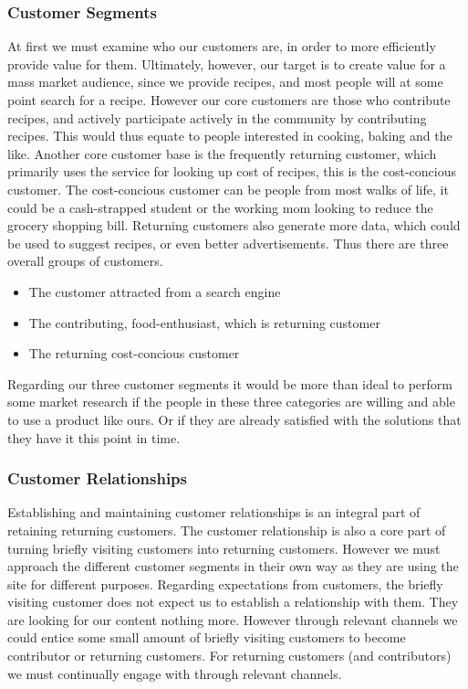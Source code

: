 \documentclass{article}
\begin{document}
\subsubsection{Customer Segments}
At first we must examine who our customers are, in order to more efficiently provide value
for them. Ultimately, however, our target is to create value for a mass market audience,
since we provide recipes, and most people will at some point search for a recipe.  However
our core customers are those who contribute recipes, and actively participate actively in the
community by contributing recipes. This would thus equate to people interested in cooking,
baking and the like.  Another core customer base is the frequently returning customer,
which primarily uses the service for looking up cost of recipes, this is the cost-concious
customer. The cost-concious customer can be people from most walks of life, it could be a
cash-strapped student or the working mom looking to reduce the grocery shopping bill.
Returning customers also generate more data, which could be used to suggest recipes, or
even better advertisements. Thus there are three overall groups of customers.

\begin{itemize}
  \item The customer attracted from a search engine
  \item The contributing, food-enthusiast, which is returning customer
  \item The returning cost-concious customer
\end{itemize}

Regarding our three  customer segments it would be more than ideal to perform some market
research if the people in these three categories are willing and able to use a product
like ours. Or if they are already satisfied with the solutions that they have it this
point in time.

\subsubsection{Customer Relationships}
Establishing and maintaining customer relationships is an integral part of retaining
returning customers. The customer relationship is also a core part of turning briefly
visiting customers into returning customers. However we must approach the different
customer segments in their own way as they are using the site for different purposes.
Regarding expectations from customers, the briefly visiting customer does not expect us to
establish a relationship with them. They are looking for our content nothing more. However
through relevant channels we could entice some small amount of briefly visiting customers
to become contributor or returning customers.
For returning customers (and contributors) we must continually engage with through
relevant channels.
\end{document}
